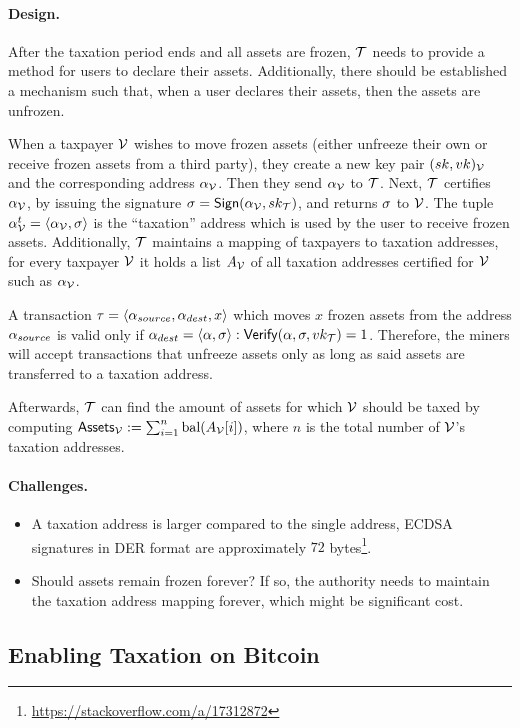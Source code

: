 \paragraph{Design.}

After the taxation period ends and all assets are frozen, $\mathcal{T}$ needs to
provide a method for users to declare their assets. Additionally, there should
be established a mechanism such that, when a user declares their assets, then
the assets are unfrozen.

When a taxpayer $\mathcal{V}$ wishes to move frozen assets (either unfreeze their own
or receive frozen assets from a third party), they create a new key pair
$(sk, vk)_\mathcal{V}$ and the corresponding address $\alpha_\mathcal{V}$. Then they send
$\alpha_\mathcal{V}$ to $\mathcal{T}$. Next, $\mathcal{T}$ certifies $\alpha_\mathcal{V}$, by
issuing the signature $\sigma = \mathsf{Sign}(\alpha_\mathcal{V}, sk_\mathcal{T})$,
and returns $\sigma$ to $\mathcal{V}$. The tuple $\alpha_\mathcal{V}^{t} = \langle
\alpha_\mathcal{V}, \sigma \rangle$ is the ``taxation'' address which is used by the
user to receive frozen assets. Additionally, $\mathcal{T}$ maintains a mapping of
taxpayers to taxation addresses, \ie for every taxpayer $\mathcal{V}$ it holds a list
$A_\mathcal{V}$ of all taxation addresses certified for $\mathcal{V}$ such as
$\alpha_\mathcal{V}$.

A transaction $\tau = \langle \alpha_{source}, \alpha_{dest}, x \rangle$
which moves $x$ frozen assets from the address $\alpha_{source}$ is valid
only if $\alpha_{dest} = \langle \alpha, \sigma \rangle:
\mathsf{Verify}(\alpha, \sigma, vk_\mathcal{T}) = 1$. Therefore, the miners
will accept transactions that unfreeze assets only as long as said assets are
transferred to a taxation address.

Afterwards, $\mathcal{T}$ can find the amount of assets for which $\mathcal{V}$ should
be taxed by computing $\mathsf{Assets}_\mathcal{V} := \sum_{i=1}^{n} \text{bal}(A_{\mathcal{V}}[i])$,
where $n$ is the total number of $\mathcal{V}$'s taxation addresses.

\paragraph{Challenges.}

\begin{itemize}
    \item A taxation address is larger compared to the single address, \eg
        ECDSA signatures in DER format are approximately $72$
        bytes\footnote{\url{https://stackoverflow.com/a/17312872}}.
    \item Should assets remain frozen forever? If so, the authority needs to
        maintain the taxation address mapping forever, which might be
        significant cost.
\end{itemize}

\subsection{Enabling Taxation on Bitcoin}\label{subsec:tax-bitcoin}
